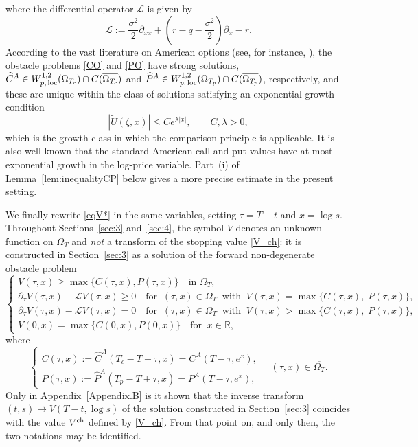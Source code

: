 \documentclass[11pt, a4paper, leqno]{amsart}
\numberwithin{equation}{section}
\theoremstyle{plain}
\theoremstyle{definition}
\theoremstyle{remark}
\def\leq{\leqslant}
\def\ge{\geqslant}
\def\geq{\geqslant}
\begin{document}
where the differential operator $\mathcal{L}$ is given by 
 \begin{equation*} %
\mathcal{L}:=\frac{\sigma^2}{2}\partial_{xx}+(r-q-\frac{\sigma^2}{2})\partial_x-r.
\end{equation*}
According to the vast literature on American options (see, for instance, \cite{BX09,JJ19,JIA05,PAS11,YJB06,ZF09,ZF09-1}), the obstacle problems \eqref{CO} and \eqref{PO} have  strong solutions,
$\widehat{C}^A \in W^{1,2}_{p\textup{,}\, \text{loc}}(\Omega_{T_c}) \cap C(\overline{\Omega_{T_c}})$ and
$\widehat{P}^A \in W^{1,2}_{p\textup{,}\, \text{loc}}(\Omega_{T_p}) \cap C(\overline{\Omega_{T_p}})$, respectively{, and these are unique within the
class of solutions satisfying an exponential growth condition
\[
    |\widetilde U(\zeta,x)|\leq Ce^{\lambda|x|},
    \qquad C,\lambda>0,
\]
which is the growth class in which the comparison principle
\cite[Theorem 3]{Rapuch2005} is applicable. It is also well known that the standard American call and put values have
at most exponential growth in the log-price variable. Part~(i) of Lemma~\ref{lem:inequalityCP} below gives
a more precise estimate in the present setting.}

{
We finally rewrite \eqref{eqV*} in the same variables, setting
$\tau=T-t$ and $x=\log s$. Throughout Sections~\ref{sec:3}
and~\ref{sec:4}, the symbol $V$ denotes an unknown function on
$\Omega_T$ and \emph{not} a transform of the stopping value
\eqref{V_ch}: it is constructed in Section~\ref{sec:3} as a solution of
the forward non-degenerate obstacle problem
}
\begin{equation}\label{AC}
    \begin{cases}
    {V(\tau,x)\geq\max\{C(\tau,x),P(\tau,x)\}\quad\text{in }\Omega_T,}\\
        \partial_\tau V(\tau,x) -\mathcal{L} V(\tau,x) \ge 0 \quad \text{for } \ (\tau,x)\in \Omega_T \ \text{ with }\  V(\tau,x)=\max\{C(\tau,x),\;P(\tau,x)\},\\
        \partial_\tau V(\tau,x) -\mathcal{L} V(\tau,x) = 0 \quad \text{for } \ (\tau,x)\in \Omega_T \ \text{ with } \  V(\tau,x)>\max\{C(\tau,x),\;P(\tau,x)\},\\
        V(0,x) = \max\{C(0,x),P(0,x)\} \quad \text{for }\ x\in\mathbb{R},
    \end{cases}
\end{equation}
where 
\begin{equation}\label{eq:CA}
   \begin{cases} C(\tau,x):=\widehat{C}^A(T_c-T+\tau,x)=C^A(T-\tau,e^x),\\ P(\tau,x):=\widehat{P}^A(T_p-T+\tau,x)=P^A(T-\tau,e^x), 
   \end{cases} \quad (\tau,x)\in \overline{\Omega_T}.
\end{equation}
{
Only in Appendix~\ref{Appendix.B} is it shown that the inverse transform
$(t,s)\mapsto V(T-t,\log s)$ of the solution constructed in
Section~\ref{sec:3} coincides with the value $V^{\rm ch}$ defined by
\eqref{V_ch}. From that point on, and only then, the two notations may
be identified.
}
\end{document}

